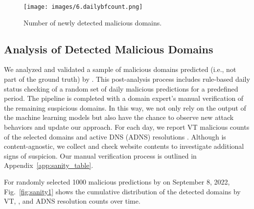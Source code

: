 \begin{figure}[t]
\centering
\texttt{[image: images/6.dailybfcount.png]}
\caption{Number of newly detected malicious domains.}
\vspace{-3mm}
\label{fig:dailyblocklistcount}
\end{figure}

\subsection{Analysis of Detected Malicious Domains}
\label{subsec:analysisofdetectedmalicious}

We analyzed and validated a sample of malicious domains predicted (i.e., not part of the ground truth) by \system.
This post-analysis process includes rule-based daily status checking of a random set of daily malicious predictions for a predefined period. The pipeline is completed with a domain expert's manual verification of the remaining suspicious domains. In this way, we not only rely on the output of the machine learning models but also have the chance to observe new attack behaviors and update our approach.
For each day, we report VT malicious counts of the selected domains and active DNS (ADNS) resolutions . 
Although \system is content-agnostic, we collect and check website contents to investigate additional signs of suspicion.
Our manual verification process is outlined in Appendix~\ref{app:sanity_table}.

For randomly selected 1000 malicious predictions by \system on September 8, 2022, Fig.~\ref{fig:sanity1} shows the cumulative distribution of the detected domains by VT, , and ADNS resolution counts over time. 

